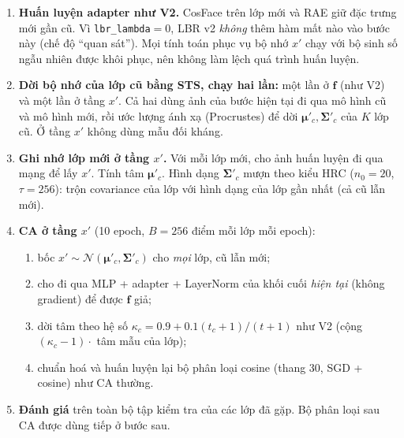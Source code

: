 \documentclass[11pt]{article}
\newcommand{\bmu}{\boldsymbol{\mu}}
\newcommand{\bSigma}{\boldsymbol{\Sigma}}
\newcommand{\vf}{\mathbf{f}}
\begin{document}
\begin{enumerate}
\item \textbf{Huấn luyện adapter như V2.} CosFace trên lớp mới và RAE giữ đặc trưng mới gần cũ. Vì
      \texttt{lbr\_lambda}$=0$, LBR v2 \emph{không} thêm hàm mất nào vào bước này (chế độ ``quan sát''). Mọi tính toán
      phục vụ bộ nhớ $x'$ chạy với bộ sinh số ngẫu nhiên được khôi phục, nên không làm lệch quá trình huấn luyện.
\item \textbf{Dời bộ nhớ của lớp cũ bằng STS, chạy hai lần:} một lần ở $\vf$ (như V2) và một lần ở tầng $x'$. Cả
      hai dùng ảnh của bước hiện tại đi qua mô hình cũ và mô hình mới, rồi ước lượng ánh xạ (Procrustes) để dời
      $\bmu'_c,\bSigma'_c$ của $K$ lớp cũ. Ở tầng $x'$ không dùng mẫu đối kháng.
\item \textbf{Ghi nhớ lớp mới ở tầng $x'$.} Với mỗi lớp mới, cho ảnh huấn luyện đi qua mạng để lấy $x'$. Tính tâm
      $\bmu'_c$. Hình dạng $\bSigma'_c$ mượn theo kiểu HRC ($n_0=20$, $\tau=256$): trộn covariance của lớp với hình
      dạng của lớp gần nhất (cả cũ lẫn mới).
\item \textbf{CA ở tầng $x'$} (10 epoch, $B=256$ điểm mỗi lớp mỗi epoch):
  \begin{enumerate}
  \item bốc $x'\sim\mathcal{N}(\bmu'_c,\bSigma'_c)$ cho \emph{mọi} lớp, cũ lẫn mới;
  \item cho đi qua MLP + adapter + LayerNorm của khối cuối \emph{hiện tại} (không gradient) để được $\vf$ giả;
  \item dời tâm theo hệ số $\kappa_c=0.9+0.1(t_c+1)/(t+1)$ như V2 (cộng $(\kappa_c-1)\cdot$ tâm mẫu của lớp);
  \item chuẩn hoá và huấn luyện lại bộ phân loại cosine (thang 30, SGD + cosine) như CA thường.
  \end{enumerate}
\item \textbf{Đánh giá} trên toàn bộ tập kiểm tra của các lớp đã gặp. Bộ phân loại sau CA được dùng tiếp ở bước sau.
\end{enumerate}
\end{document}
